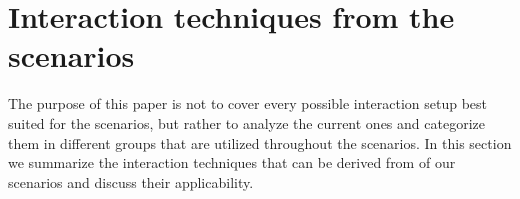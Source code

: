 \documentclass[review,journal]{vgtc}         %
\begin{document}








\section{Interaction techniques from the scenarios} \label{sec:techniques}
The purpose of this paper is not to cover every possible interaction setup best suited for the scenarios, but rather to analyze the current ones and categorize them in different groups that are utilized throughout the scenarios.
In this section we summarize the interaction techniques that can be derived from of our scenarios and discuss their applicability.
\end{document}
